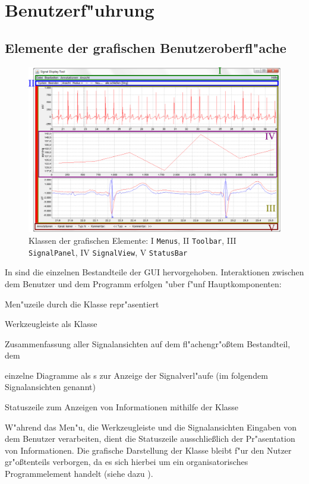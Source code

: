 \section{Benutzerf"uhrung}
\label{sec:gui}

\subsection{Elemente der grafischen Benutzeroberfl"ache}

\begin{figure}[htb]
\centering
\includegraphics[width=\textwidth]{bilder/programm_ansicht.eps}
\caption[Klassen der grafischen Elemente]{Klassen der grafischen Elemente: I \texttt{Menus}, II \texttt{Toolbar}, III \texttt{SignalPanel}, IV \texttt{SignalView}, V \texttt{StatusBar}}
\label{pic:gui_elements_and_classes}
\end{figure}

In  sind die einzelnen Bestandteile der \ac{GUI} hervorgehoben.
Interaktionen zwischen dem Benutzer und dem Programm erfolgen "uber f"unf Hauptkomponenten:
\begin{enumerate}
	{
	\renewcommand{\theenumi}{\Roman{enumi}}
	\renewcommand{\labelenumi}{(\theenumi)}
	\item Men"uzeile durch die Klasse  repr"asentiert
	\item Werkzeugleiste als Klasse 
	\item Zusammenfassung aller Signalansichten auf dem fl"achengr"o{\ss}tem Bestandteil, dem 
	\item einzelne Diagramme als s zur Anzeige der Signalverl"aufe (im folgendem Signalansichten genannt)
	\item Statuszeile zum Anzeigen von Informationen mithilfe der Klasse 
	}
\end{enumerate}
W"ahrend das Men"u, die Werkzeugleiste und die Signalansichten Eingaben von dem Benutzer verarbeiten, dient die Statuszeile ausschlie{\ss}lich der Pr"asentation von Informationen.
Die grafische Darstellung der Klasse  bleibt f"ur den Nutzer gr"o{\ss}tenteils verborgen, da es sich hierbei um ein organisatorisches Programmelement handelt (siehe dazu ).

